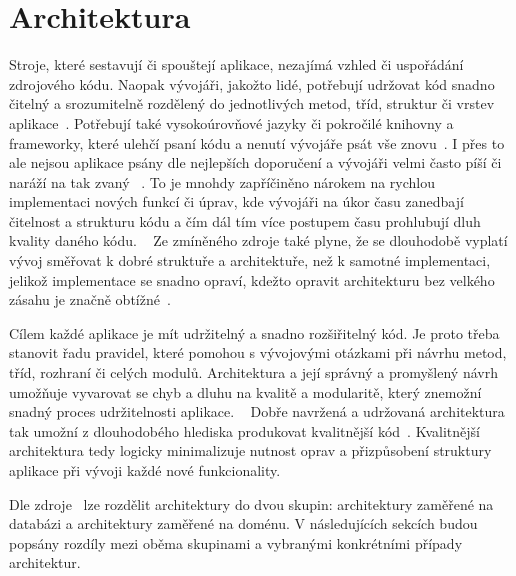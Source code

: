 \section{Architektura}

Stroje,
které sestavují či spouštejí aplikace,
nezajímá vzhled či uspořádání zdrojového kódu.
Naopak vývojáři,
jakožto lidé,
potřebují udržovat kód snadno čitelný a srozumitelně rozdělený do jednotlivých
metod, tříd, struktur či vrstev aplikace~\cite{architecture}.
Potřebují také vysokoúrovňové jazyky či pokročilé knihovny a frameworky,
které ulehčí psaní kódu a nenutí vývojáře psát vše znovu~\cite{architecture}.
I přes to ale nejsou aplikace psány dle nejlepších doporučení
a vývojáři velmi často píší či naráží na tak zvaný ~\cite{architecture}.
To je mnohdy zapříčiněno nárokem na rychlou implementaci nových funkcí či úprav,
kde vývojáři na úkor času zanedbají čitelnost a strukturu kódu
a čím dál tím více postupem času prohlubují dluh kvality daného kódu.
\emph{}~\cite[strana~140]{martin_clean_architecture}
Ze zmíněného zdroje také plyne,
že se dlouhodobě vyplatí vývoj směřovat k dobré struktuře a architektuře,
než k samotné implementaci,
jelikož implementace se snadno opraví,
kdežto opravit architekturu bez velkého zásahu
je značně obtížné~\cite[strana~135--146]{martin_clean_architecture}.

Cílem každé aplikace je mít udržitelný a snadno rozšiřitelný kód.
Je proto třeba stanovit řadu pravidel,
které pomohou s vývojovými otázkami při návrhu metod, tříd, rozhraní či
celých modulů.
Architektura a její správný a promyšlený návrh umožňuje vyvarovat
se chyb a dluhu na kvalitě a modularitě,
který znemožní snadný proces udržitelnosti aplikace.
\emph{}~\cite[strana~137]{martin_clean_architecture}
Dobře navržená a udržovaná architektura tak umožní z dlouhodobého hlediska
produkovat kvalitnější kód~\cite[strana~135--146]{martin_clean_architecture}.
Kvalitnější architektura tedy logicky minimalizuje nutnost oprav a
přizpůsobení struktury aplikace při vývoji každé nové funkcionality.

Dle zdroje~\cite{architecture} lze rozdělit architektury do dvou skupin:
architektury zaměřené na databázi a architektury zaměřené na doménu.
V následujících sekcích budou popsány rozdíly mezi oběma skupinami
a vybranými konkrétními případy architektur.

